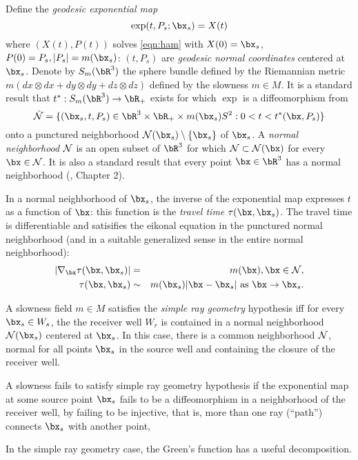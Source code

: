 Define the {\em geodesic exponential map}
\[
\exp(t,P_s; \bx_s) = X(t)
\]
where $(X(t),P(t))$ solves \ref{eqn:ham} with $X(0)=\bx_s$,
$P(0)=P_s, |P_s|=m(\bx_s)$: $(t,P_s)$ are {\em
  geodesic normal coordinates} centered at $\bx_s$. Denote by
$S_m(\bR^3)$ the sphere bundle defined by the Riemannian metric $m (dx
\otimes dx + dy \otimes dy + dz \otimes dz)$ defined by the slowness
$m \in M$. It is a standard
result that $t^*:S_m(\bR^3) \rightarrow \bR_+$ exists for which
$\exp$ is a diffeomorphism from 
\begin{equation}
\label{eqn:prenorm}
\tilde{{\cal N}} = \{(\bx_s,t,P_s) \in
\bR^3 \times \bR_+ \times m(\bx_s)S^2: 0 < t < t^*(\bx,P_s)\}
\end{equation}
 onto a punctured
neighborhood ${\cal N}(\bx_s) \setminus \{\bx_s\}$ of $\bx_s$. A {\em normal neighborhood}
${\cal N}$ is an open subset of $\bR^3$ for which ${\cal N} \subset
{\cal N}(\bx)$ for every $\bx \in {\cal N}$. It is also a standard
result that every point $\bx \in \bR^3$ has a normal neighborhood (\cite{Friedlander:75}, Chapter 2). 

In a normal neighborhood of $\bx_s$, the inverse of the exponential
map expresses $t$ as a function of $\bx$: this function is the
{\em travel time} $\tau(\bx,\bx_s)$.
The travel time is differentiable and satisifies the eikonal equation in the punctured normal
neighborhood (and in a suitable generalized sense in the entire normal
neighborhood):
\begin{eqnarray}
\label{eqn:eik}
|\nabla_{\bx} \tau(\bx,\bx_s)|&=&m(\bx), \bx \in {\cal N}, \nonumber \\
\tau(\bx,\bx_s) & \sim & m(\bx_s)|\bx-\bx_s| \mbox{ as } \bx \rightarrow 
\bx_s. 
\end{eqnarray}

A slowness field $m \in M$ satisfies the {\em simple ray geometry}
hypothesis iff for every $\bx_s \in W_s$, the
the receiver well $W_r$ is contained in a
normal neighborhood ${\cal N}(\bx_s)$ centered at $\bx_s$. In this case, there is a common
neighborhood ${\cal N}$, normal for all points $\bx_s$ in the source
well and containing the closure of the receiver well.


A slowness fails to satisfy simple ray geometry hypothesis if the
exponential map at some source point $\bx_s$ fails to be a
diffeomorphism in a neighborhood of the receiver well, by failing to
be injective, that is, more than one ray (``path'') connects $\bx_s$
with another point,

In the simple ray geometry case, the Green's function has a useful
decomposition. 

